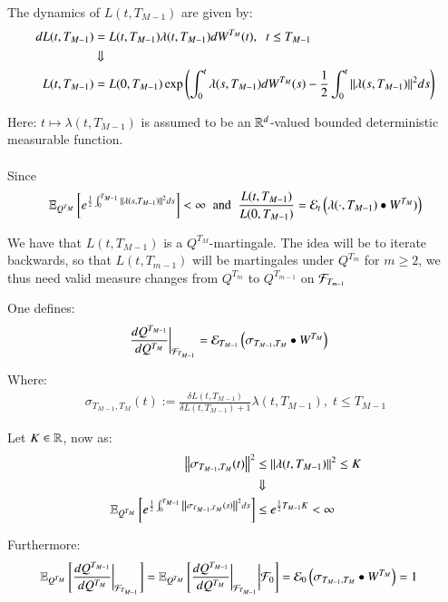The dynamics of $L(t,T_{M-1})$ are given by: 
\begin{align*}
dL(t,T_{M-1}) &= L(t,T_{M-1})\lambda(t,T_{M-1})dW^{T_{M}}(t), \;\; t \leq T_{M-1} \\ 
&\Downarrow \\ 
L(t,T_{M-1}) &= L(0,T_{M-1})\exp\left(
\int_{0}^{t}\lambda(s,T_{M-1})dW^{T_{M}}(s) 
-\frac{1}{2}\int_{0}^{t}\norm{\lambda(s, T_{M-1})}^{2}ds
\right)
\end{align*}

Here: $t \mapsto \lambda(t,T_{M-1})$ is assumed to be an $\mathbb{R}^{d}$-valued bounded deterministic measurable function. 
\\~\\ 
Since
\begin{align*}
\mathbb{E}_{Q^{T_{M}}}\left[
e^{\frac{1}{2}\int_{0}^{T_{M-1}}\norm{\lambda(s,T_{M-1})}^{2}ds}
\right] < \infty 
\;\;\text{and}\;\;
\frac{L(t,T_{M-1})}{L(0,T_{M-1})} = \mathcal{E}_{t}\left(
\lambda(\cdot, T_{M-1})\bullet W^{T_{M}})
\right)
\end{align*}

We have that $L(t,T_{M-1})$ is a $Q^{T_{M}}$-martingale. The idea will be to iterate backwards, so that $L(t,T_{m-1})$ will be martingales under $Q^{T_{m}}$ for $m\geq 2$, we thus need valid measure changes from $Q^{T_{m}}$ to $Q^{T_{m-1}}$ on $\mathcal{F}_{T_{m-1}}$

\newpage

One defines:
\begin{align*}
\frac{
dQ^{T_{M-1}}
}{
dQ^{T_{M}}
}\bigg{|}_{\mathcal{F}_{T_{M-1}}}
&= 
\mathcal{E}_{T_{M-1}}\left(
\sigma_{T_{M-1}, T_{M}}\bullet W^{T_{M}}
\right)
\end{align*}

Where: 
\begin{align*}
\sigma_{T_{M-1}, T_{M}}(t) := 
\frac{
\delta L(t,T_{M-1})
}{
\delta L(t,T_{M-1}) + 1
}
\lambda(t,T_{M-1}), \;t\leq T_{M-1}
\end{align*}

Let $K\in \mathbb{R}$, now as: 
\begin{align*}
\norm{\sigma_{T_{M-1}, T_{M}}(t)}^{2}
&\leq 
\norm{\lambda(t,T_{M-1})}^{2} \leq K \\ 
&\Downarrow \\ 
\mathbb{E}_{Q^{T_{M}}}\left[
e^{
\frac{1}{2}\int_{0}^{T_{M-1}}\norm{\sigma_{T_{M-1}, T_{M}}(s)}^{2}ds
}
\right]
&\leq 
e^{
\frac{1}{2}T_{M-1}K
} < \infty
\end{align*}


Furthermore: 
\begin{align*}
\mathbb{E}_{Q^{T_{M}}}\left[
\frac{
dQ^{T_{M-1}}
}{
dQ^{T_{M}}
}\bigg{|}_{\mathcal{F}_{T_{M-1}}}
\right] 
&= 
\mathbb{E}_{Q^{T_{M}}}\left[
\frac{
dQ^{T_{M-1}}
}{
dQ^{T_{M}}
}\bigg{|}_{\mathcal{F}_{T_{M-1}}}
\bigg{|}\mathcal{F}_{0}
\right] 
=  
\mathcal{E}_{0}\left(
\sigma_{T_{M-1}, T_{M}} \bullet W^{T_{M}}
\right)
= 1
\end{align*}

